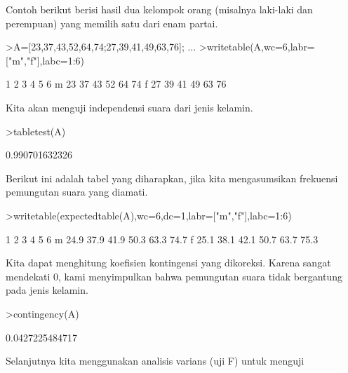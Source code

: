 \documentclass[a4paper,10pt]{article}
\begin{document}
\begin{eulernotebook}
\begin{eulercomment}
\begin{eulercomment}
\begin{eulercomment}
Contoh berikut berisi hasil dua kelompok orang (misalnya laki-laki dan
perempuan) yang memilih satu dari enam partai.
\end{eulercomment}
\begin{eulerprompt}
>A=[23,37,43,52,64,74;27,39,41,49,63,76];  ...
>writetable(A,wc=6,labr=["m","f"],labc=1:6)
\end{eulerprompt}
\begin{euleroutput}
             1     2     3     4     5     6
       m    23    37    43    52    64    74
       f    27    39    41    49    63    76
\end{euleroutput}
\begin{eulercomment}
Kita akan menguji independensi suara dari jenis kelamin.
\end{eulercomment}
\begin{eulerprompt}
>tabletest(A)
\end{eulerprompt}
\begin{euleroutput}
  0.990701632326
\end{euleroutput}
\begin{eulercomment}
Berikut ini adalah tabel yang diharapkan, jika kita mengasumsikan
frekuensi pemungutan suara yang diamati.
\end{eulercomment}
\begin{eulerprompt}
>writetable(expectedtable(A),wc=6,dc=1,labr=["m","f"],labc=1:6)
\end{eulerprompt}
\begin{euleroutput}
             1     2     3     4     5     6
       m  24.9  37.9  41.9  50.3  63.3  74.7
       f  25.1  38.1  42.1  50.7  63.7  75.3
\end{euleroutput}
\begin{eulercomment}
Kita dapat menghitung koefisien kontingensi yang dikoreksi. Karena
sangat mendekati 0, kami menyimpulkan bahwa pemungutan suara tidak
bergantung pada jenis kelamin.
\end{eulercomment}
\begin{eulerprompt}
>contingency(A)
\end{eulerprompt}
\begin{euleroutput}
  0.0427225484717
\end{euleroutput}
\begin{eulercomment}
\begin{eulercomment}
\begin{eulercomment}
Selanjutnya kita menggunakan analisis varians (uji F) untuk menguji

\end{eulercomment}
\end{eulercomment}
\end{eulercomment}
\end{eulercomment}
\end{eulercomment}
\end{eulernotebook}
\end{document}
